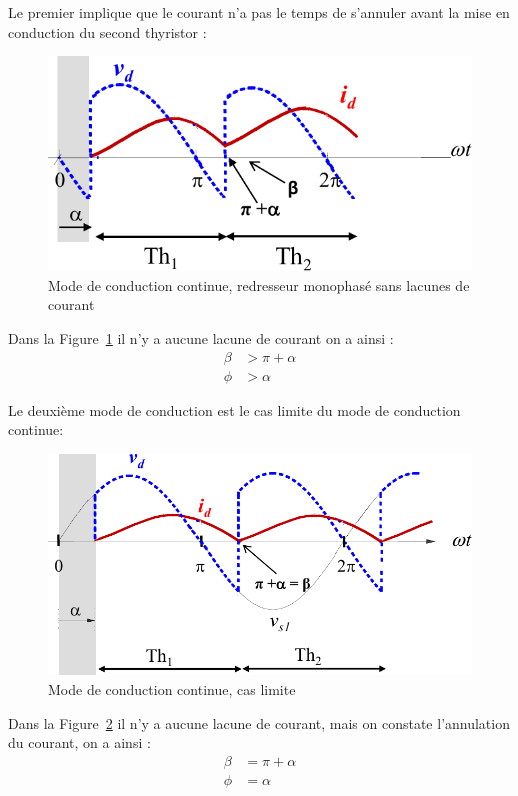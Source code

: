 \documentclass[a4paper, 11pt, openany, oneside, french]{article}
\begin{document}
\clearpage
Le premier implique que le courant n'a pas le temps de s'annuler avant la mise en conduction du second thyristor :

\begin{figure}[!ht]
    \centering
    \includegraphics[width=0.8\linewidth]{ccm}
    \caption{Mode de conduction continue, redresseur monophasé sans lacunes de courant}
    \label{fig:ccm}
\end{figure}

Dans la Figure~\ref{fig:ccm} il n'y a aucune lacune de courant on a ainsi :
\begin{align*}
    \beta &> \pi+\alpha\\
    \phi &> \alpha
\end{align*}

Le deuxième mode de conduction est le cas limite du mode de conduction continue:
\begin{figure}[!ht]
    \centering
    \includegraphics[width=0.8\linewidth]{limit_ccm}
    \caption{Mode de conduction continue, cas limite}
    \label{fig:lm_ccm}
\end{figure}

Dans la Figure~\ref{fig:lm_ccm} il n'y a aucune lacune de courant, mais on constate l'annulation du courant, on a ainsi :
\begin{align*}
    \beta &= \pi+\alpha\\
    \phi &= \alpha
\end{align*}
\end{document}

